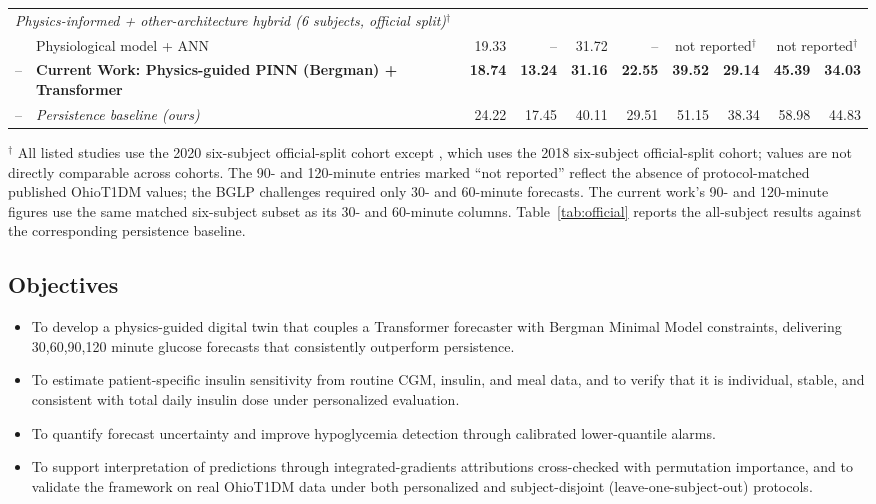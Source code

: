 \documentclass[journal]{IEEEtran}
\begin{document}
\begin{table}[t]
{\begin{tabular}{l>{\raggedright\arraybackslash}p{2.6cm}rrrrrrrr}
\midrule
\multicolumn{10}{l}{\textit{Physics-informed + other-architecture hybrid (6 subjects, official split)$^{\dagger}$}} \\
\cite{ref58} & Physiological model + ANN & 19.33 & -- & 31.72 & -- & \multicolumn{2}{c}{not reported$^{\dagger}$} & \multicolumn{2}{c}{not reported$^{\dagger}$} \\
\midrule
-- & \textbf{Current Work: Physics-guided PINN (Bergman) + Transformer} & \textbf{18.74} & \textbf{13.24} & \textbf{31.16} & \textbf{22.55} & \textbf{39.52} & \textbf{29.14} & \textbf{45.39} & \textbf{34.03} \\
-- & \emph{Persistence baseline (ours)} & 24.22 & 17.45 & 40.11 & 29.51 & 51.15 & 38.34 & 58.98 & 44.83 \\
\bottomrule
\end{tabular}%
}
\vspace{2pt}
\raggedright\footnotesize
$^{\dagger}$ All listed studies use the 2020 six-subject official-split cohort except \cite{ref58}, which uses the 2018 six-subject official-split cohort; values are not directly comparable across cohorts. The 90- and 120-minute entries marked ``not reported'' reflect the absence of protocol-matched published OhioT1DM values; the BGLP challenges required only 30- and 60-minute forecasts. The current work's 90- and 120-minute figures use the same matched six-subject subset as its 30- and 60-minute columns. Table~\ref{tab:official} reports the all-subject results against the corresponding persistence baseline.
\end{table}
 


\subsection{Objectives}
\begin{itemize}
\sloppy
\item To develop a physics-guided digital twin that couples a Transformer forecaster with Bergman Minimal Model constraints, delivering 30,60,90,120 minute glucose forecasts that consistently outperform persistence.
\item To estimate patient-specific insulin sensitivity from routine CGM, insulin, and meal data, and to verify that it is individual, stable, and consistent with total daily insulin dose under personalized evaluation.
\item To quantify forecast uncertainty and improve hypoglycemia detection through calibrated lower-quantile alarms.
\item To support interpretation of predictions through integrated-gradients attributions cross-checked with permutation importance, and to validate the framework on real OhioT1DM data under both personalized and subject-disjoint (leave-one-subject-out) protocols.
\end{itemize}
\end{document}
